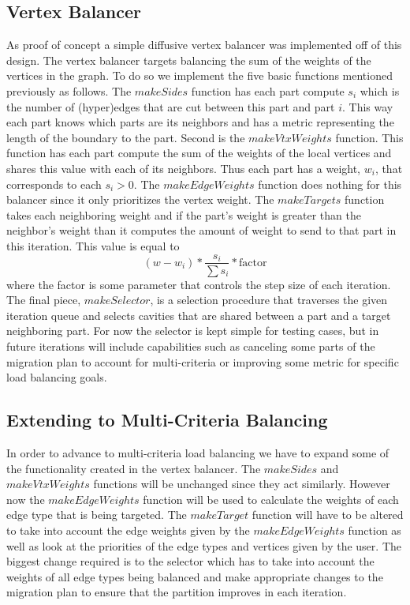 \documentclass[a4paper]{article}
\begin{document}
\subsection{Vertex Balancer}
As proof of concept a simple diffusive vertex balancer was implemented off of this design. The vertex balancer targets balancing the sum of the weights of the vertices in the graph. To do so we implement the five basic functions mentioned previously as follows. The $makeSides$ function has each part compute $s_i$ which is the number of (hyper)edges that are cut between this part and part $i$. This way each part knows which parts are its neighbors and has a metric representing the length of the boundary to the part. Second is the $makeVtxWeights$ function. This function has each part compute the sum of the weights of the local vertices and shares this value with each of its neighbors. Thus each part has a weight, $w_i$, that corresponds to each $s_i>0$. The $makeEdgeWeights$ function does nothing for this balancer since it only prioritizes the vertex weight. The $makeTargets$ function takes each neighboring weight and if the part's weight is greater than the neighbor's weight than it computes the amount of weight to send to that part in this iteration. This value is equal to 
$$(w-w_i)*\dfrac{s_i}{\sum{s_i}}*\text{factor}$$
where the factor is some parameter that controls the step size of each iteration. The final piece, $makeSelector$, is a selection procedure that traverses the given iteration queue and selects cavities that are shared between a part and a target neighboring part. For now the selector is kept simple for testing cases, but in future iterations will include capabilities such as canceling some parts of the migration plan to account for multi-criteria or improving some metric for specific load balancing goals.

\subsection{Extending to Multi-Criteria Balancing}
In order to advance to multi-criteria load balancing we have to expand some of the functionality created in the vertex balancer. The $makeSides$ and $makeVtxWeights$ functions will be unchanged since they act similarly. However now the $makeEdgeWeights$ function will be used to calculate the weights of each edge type that is being targeted. The $makeTarget$ function will have to be altered to take into account the edge weights given by the $makeEdgeWeights$ function as well as look at the priorities of the edge types and vertices given by the user. The biggest change required is to the selector which has to take into account the weights of all edge types being balanced and make appropriate changes to the migration plan to ensure that the partition improves in each iteration. 
\end{document}

